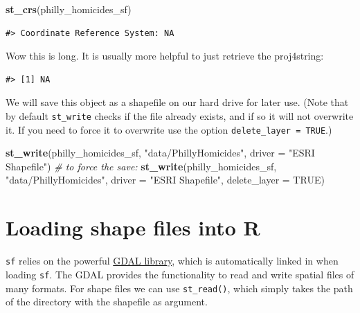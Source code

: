 \documentclass[
]{book}
\newenvironment{Shaded}{\begin{snugshade}}{\end{snugshade}}
\newcommand{\AttributeTok}[1]{\textcolor[rgb]{0.13,0.29,0.53}{#1}}
\newcommand{\CommentTok}[1]{\textcolor[rgb]{0.56,0.35,0.01}{\textit{#1}}}
\newcommand{\ConstantTok}[1]{\textcolor[rgb]{0.56,0.35,0.01}{#1}}
\newcommand{\FunctionTok}[1]{\textcolor[rgb]{0.13,0.29,0.53}{\textbf{#1}}}
\newcommand{\NormalTok}[1]{#1}
\newcommand{\SpecialCharTok}[1]{\textcolor[rgb]{0.81,0.36,0.00}{\textbf{#1}}}
\newcommand{\StringTok}[1]{\textcolor[rgb]{0.31,0.60,0.02}{#1}}
\begin{document}
\begin{Shaded}
\begin{Highlighting}[]
\FunctionTok{st\_crs}\NormalTok{(philly\_homicides\_sf)}
\end{Highlighting}
\end{Shaded}

\begin{verbatim}
#> Coordinate Reference System: NA
\end{verbatim}

Wow this is long. It is usually more helpful to just retrieve the proj4string:

\begin{Shaded}
\end{Shaded}

\begin{verbatim}
#> [1] NA
\end{verbatim}

We will save this object as a shapefile on our hard drive for later use. (Note that by default \texttt{st\_write} checks if the file already exists, and if so it will not overwrite it. If you need to force it to overwrite use the option \texttt{delete\_layer\ =\ TRUE}.)

\begin{Shaded}
\begin{Highlighting}[]
\FunctionTok{st\_write}\NormalTok{(philly\_homicides\_sf, }\StringTok{"data/PhillyHomicides"}\NormalTok{, }\AttributeTok{driver =} \StringTok{"ESRI Shapefile"}\NormalTok{)}
\CommentTok{\# to force the save: }
\FunctionTok{st\_write}\NormalTok{(philly\_homicides\_sf, }\StringTok{"data/PhillyHomicides"}\NormalTok{, }\AttributeTok{driver =} \StringTok{"ESRI Shapefile"}\NormalTok{, }\AttributeTok{delete\_layer =} \ConstantTok{TRUE}\NormalTok{)}
\end{Highlighting}
\end{Shaded}

\hypertarget{loading-shape-files-into-r}{%
\section{Loading shape files into R}\label{loading-shape-files-into-r}}

\texttt{sf} relies on the powerful \href{http://gdal.org}{GDAL library}, which is automatically linked in when loading \texttt{sf}. The GDAL provides the functionality to read and write spatial files of many formats. For shape files we can use \texttt{st\_read()}, which simply takes the path of the directory with the shapefile as argument.
\end{document}
